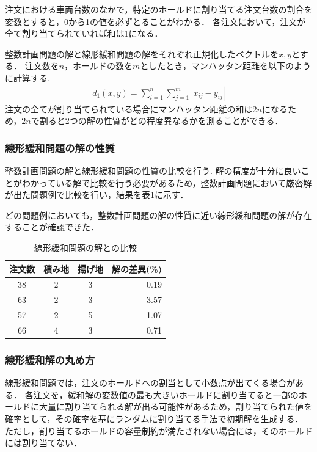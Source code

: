 注文における車両台数のなかで，特定のホールドに割り当てる注文台数の割合を変数とすると，0から1の値を必ずとることがわかる．
各注文において，注文が全て割り当てられていれば和は1になる．

整数計画問題の解と線形緩和問題の解をそれぞれ正規化したベクトルを$x,y$とする．
注文数を$n$，ホールドの数を$m$としたとき，マンハッタン距離を以下のように計算する.
\begin{align*}
 d_1(x,y) =\sum_{i=1}^n \sum_{j=1}^m|x_{ij}-y_{ij}|
\end{align*}
注文の全てが割り当てられている場合にマンハッタン距離の和は$2n$になるため，$2n$で割ると2つの解の性質がどの程度異なるかを測ることができる．


\subsubsection{線形緩和問題の解の性質}
整数計画問題の解と線形緩和問題の性質の比較を行う.
解の精度が十分に良いことがわかっている解で比較を行う必要があるため，整数計画問題において厳密解が出た問題例で比較を行い，結果を表\ref{hamming}に示す．

どの問題例においても，整数計画問題の解の性質に近い線形緩和問題の解が存在することが確認できた．

\begin{table}[h]
  \centering
  \caption{線形緩和問題の解との比較}
  \label{hamming}
\begin{tabular}{cccr}
\hline
注文数 & 積み地 & 揚げ地 & \multicolumn{1}{c}{解の差異(\%)} \\ \hline
38 & 2   & 3   & 0.19                        \\
63 & 2   & 3   & 3.57                         \\
57 & 2   & 5   & 1.07                         \\
66 & 4   & 3   & 0.71                        \\ \hline
\end{tabular}
\end{table}

\subsubsection{線形緩和解の丸め方}
線形緩和問題では，注文のホールドへの割当として小数点が出てくる場合がある．
各注文を，緩和解の変数値の最も大きいホールドに割り当てると一部のホールドに大量に割り当てられる解が出る可能性があるため，割り当てられた値を確率として，その確率を基にランダムに割り当てる手法で初期解を生成する．
ただし，割り当てるホールドの容量制約が満たされない場合には，そのホールドには割り当てない．


